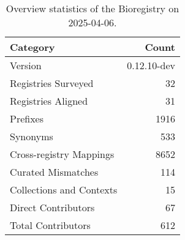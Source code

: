 \begin{table}
\caption{Overview statistics of the Bioregistry on 2025-04-06.}
\label{tab:bioregistry-summary}
\begin{tabular}{lr}
\toprule
Category & Count \\
\midrule
Version & 0.12.10-dev \\
Registries Surveyed & 32 \\
Registries Aligned & 31 \\
Prefixes & 1916 \\
Synonyms & 533 \\
Cross-registry Mappings & 8652 \\
Curated Mismatches & 114 \\
Collections and Contexts & 15 \\
Direct Contributors & 67 \\
Total Contributors & 612 \\
\bottomrule
\end{tabular}
\end{table}
